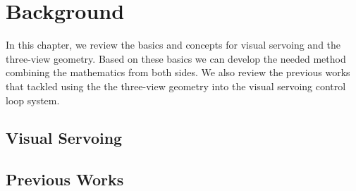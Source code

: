 \chapter{Background} \label{chap:background}

In this chapter, we review the basics and concepts for visual servoing and the three-view geometry. Based on these basics we can develop the needed method combining the mathematics from both sides. We also review the previous works that tackled using the the three-view geometry into the visual servoing control loop system.




\section{Visual Servoing}


\section{Previous Works}
